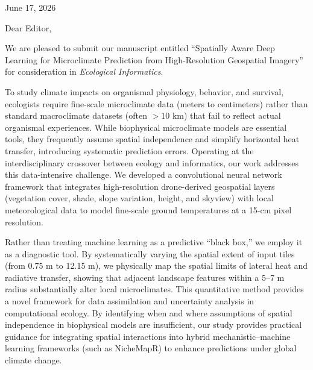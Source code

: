 \documentclass[12pt]{letter}
\begin{document}
\begin{letter}{}

\address{
    Dr. Ofir Levy \\
    School of Zoology, Faculty of Life Sciences \\
    Tel Aviv University, 6997801, Israel \\
    Email: \href{mailto:levyofir@tauex.tau.ac.il}{levyofir@tauex.tau.ac.il} \\
    Phone: +972504384717
}

\signature{Ofir Levy, Ph.D.}

\opening{June 17, 2026}
\noindent Dear Editor,

\vspace{0.5em}
We are pleased to submit our manuscript entitled ``Spatially Aware Deep Learning for Microclimate Prediction from High-Resolution Geospatial Imagery'' for consideration in \textit{Ecological Informatics}.

To study climate impacts on organismal physiology, behavior, and survival, ecologists require fine-scale microclimate data (meters to centimeters) rather than standard macroclimate datasets (often $>10$ km) that fail to reflect actual organismal experiences. While biophysical microclimate models are essential tools, they frequently assume spatial independence and simplify horizontal heat transfer, introducing systematic prediction errors. Operating at the interdisciplinary crossover between ecology and informatics, our work addresses this data-intensive challenge. We developed a convolutional neural network framework that integrates high-resolution drone-derived geospatial layers (vegetation cover, shade, slope variation, height, and skyview) with local meteorological data to model fine-scale ground temperatures at a 15-cm pixel resolution.

Rather than treating machine learning as a predictive ``black box,'' we employ it as a diagnostic tool. By systematically varying the spatial extent of input tiles (from 0.75 m to 12.15 m), we physically map the spatial limits of lateral heat and radiative transfer, showing that adjacent landscape features within a 5--7 m radius substantially alter local microclimates. This quantitative method provides a novel framework for data assimilation and uncertainty analysis in computational ecology. By identifying when and where assumptions of spatial independence in biophysical models are insufficient, our study provides practical guidance for integrating spatial interactions into hybrid mechanistic--machine learning frameworks (such as NicheMapR) to enhance predictions under global climate change.


\end{letter}
\end{document}
